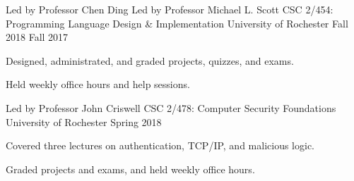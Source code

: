 

\begin{cventries}

  \cventryta
    {Led by Professor Chen Ding} %
    {Led by Professor Michael L. Scott} %
    {CSC 2/454: Programming Language Design \& Implementation} %
    {University of Rochester} %
    {Fall 2018} %
    {Fall 2017} %
    {
      \begin{cvitems} %
        \item {Designed, administrated, and graded projects, quizzes, and exams.}
        \item {Held weekly office hours and help sessions.}
      \end{cvitems}
    }

  \cventry
    {Led by Professor John Criswell} %
    {CSC 2/478: Computer Security Foundations} %
    {University of Rochester} %
    {Spring 2018} %
    {
      \begin{cvitems} %
        \item {Covered three lectures on authentication, TCP/IP, and malicious logic.}
        \item {Graded projects and exams, and held weekly office hours.}
      \end{cvitems}
    }
\end{cventries}
